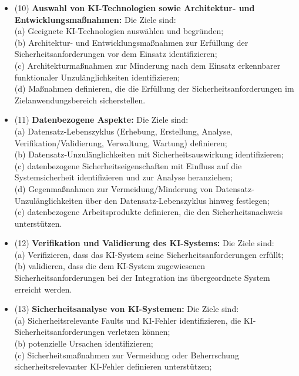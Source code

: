 \begin{itemize}
    (d) erforderliche Off-/On-board-Maßnahmen gemäß Abschnitt 14 spezifizieren.
  \item[\dotY] (10) \textbf{Auswahl von KI-Technologien sowie Architektur- und Entwicklungsmaßnahmen:} Die Ziele sind:\\
    (a) Geeignete KI-Technologien auswählen und begründen;\\
    (b) Architektur- und Entwicklungsmaßnahmen zur Erfüllung der Sicherheitsanforderungen vor dem Einsatz identifizieren;\\
    (c) Architekturmaßnahmen zur Minderung nach dem Einsatz erkennbarer funktionaler Unzulänglichkeiten identifizieren;\\
    (d) Maßnahmen definieren, die die Erfüllung der Sicherheitsanforderungen im Zielanwendungsbereich sicherstellen.
  \item[\dotR] (11) \textbf{Datenbezogene Aspekte:} Die Ziele sind:\\
    (a) Datensatz-Lebenszyklus (Erhebung, Erstellung, Analyse, Verifikation/Validierung, Verwaltung, Wartung) definieren;\\
    (b) Datensatz-Unzulänglichkeiten mit Sicherheitsauswirkung identifizieren;\\
    (c) datenbezogene Sicherheitseigenschaften mit Einfluss auf die Systemsicherheit identifizieren und zur Analyse heranziehen;\\
    (d) Gegenmaßnahmen zur Vermeidung/Minderung von Datensatz-Unzulänglichkeiten über den Datensatz-Lebenszyklus hinweg festlegen;\\
    (e) datenbezogene Arbeitsprodukte definieren, die den Sicherheitsnachweis unterstützen.
  \item[\dotG] (12) \textbf{Verifikation und Validierung des KI-Systems:} Die Ziele sind:\\
    (a) Verifizieren, dass das KI-System seine Sicherheitsanforderungen erfüllt;\\
    (b) validieren, dass die dem KI-System zugewiesenen Sicherheitsanforderungen bei der Integration ins übergeordnete System erreicht werden.
  \item[\dotY] (13) \textbf{Sicherheitsanalyse von KI-Systemen:} Die Ziele sind:\\
    (a) Sicherheitsrelevante Faults und KI-Fehler identifizieren, die KI-Sicherheitsanforderungen verletzen können;\\
    (b) potenzielle Ursachen identifizieren;\\
    (c) Sicherheitsmaßnahmen zur Vermeidung oder Beherrschung sicherheitsrelevanter KI-Fehler definieren unterstützen;\\

\end{itemize}
